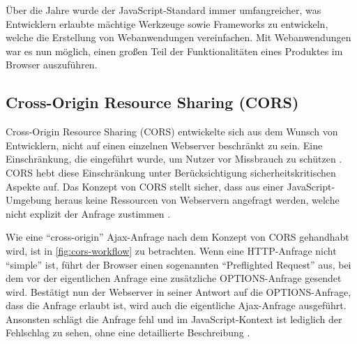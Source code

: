 Über die Jahre wurde der JavaScript-Standard immer umfangreicher, was Entwicklern erlaubte mächtige Werkzeuge sowie Frameworks zu entwickeln, welche die Erstellung von Webanwendungen vereinfachen. Mit Webanwendungen war es nun möglich, einen großen Teil der Funktionalitäten eines Produktes im Browser auszuführen.


%


\subsection{Cross-Origin Resource Sharing (CORS)}

Cross-Origin Resource Sharing (CORS) \cite{AuthorizingCORS} entwickelte sich aus dem Wunsch von Entwicklern, nicht auf einen einzelnen Webserver beschränkt zu sein. Eine Einschränkung, die eingeführt wurde, um Nutzer vor Missbrauch zu schützen \cite{BrowserProtectionAgainstCSRF}. CORS hebt diese Einschränkung unter Berücksichtigung sicherheitskritischen Aspekte auf. Das Konzept von CORS stellt sicher, dass aus einer JavaScript-Umgebung heraus keine Ressourcen von Webservern angefragt werden, welche nicht explizit der Anfrage zustimmen \cite{MDNCORS}.

Wie eine \enquote{cross-origin} Ajax-Anfrage nach dem Konzept von CORS gehandhabt wird, ist in \autoref{fig:cors-workflow} zu betrachten. Wenn eine HTTP-Anfrage nicht \enquote{simple}\footnotemark{} ist, führt der Browser einen sogenannten \enquote{Preflighted Request} aus, bei dem vor der eigentlichen Anfrage eine zusätzliche OPTIONS-Anfrage gesendet wird. Bestätigt nun der Webserver in seiner Antwort auf die OPTIONS-Anfrage, dass die Anfrage erlaubt ist, wird auch die eigentliche Ajax-Anfrage ausgeführt. Ansonsten schlägt die Anfrage fehl und im JavaScript-Kontext ist lediglich der Fehlschlag zu sehen, ohne eine detaillierte Beschreibung \cite{MDNCORS}.


